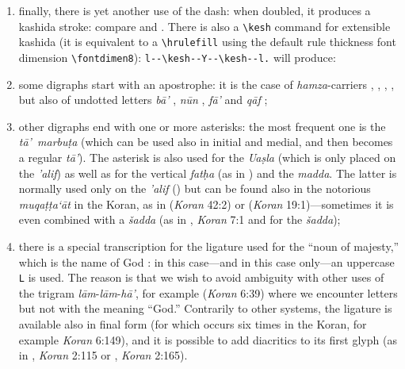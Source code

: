 \documentclass[11pt,a4paper]{article}
\def\hamza{'}%
\def\ayn{`}%
\begin{document}
\begin{enumerate}

\item finally, there is yet another use of the dash: when doubled, it produces a kashida
stroke: compare  and . There is also a \verb=\kesh= command for extensible kashida (it is equivalent to a \verb=\hrulefill= using the default rule thickness font dimension \verb=\fontdimen8=): \verb=l--\kesh--Y--\kesh--l.= will produce:

\noindent{}

\item some digraphs start with an apostrophe: it is the case of \emph{hamza}-carriers , , , ,  but also of undotted letters \emph{b\=a\hamza} , \emph{n\=un} , \emph{f\=a\hamza}  and \emph{q\=af} ;

\item other digraphs end with one or more asterisks: the most frequent one is the \emph{t\=a\hamza\ marbu\d{t}a}  (which can be used also in initial and medial, and then becomes a regular \emph{t\=a\hamza}). The asterisk is also used for the \emph{Ua\d{s}la} (which is only placed on the \emph{\hamza$\!$alif})  as well as for the vertical \emph{fat\d{h}a} (as in ) and the \emph{madda}. The latter is normally used only on the \emph{\hamza$\!$alif} () but can be found also in the notorious \emph{muqa\d t\d ta\ayn\=at} in the Koran, as in  (\emph{Koran} 42:2) or  (\emph{Koran} 19:1)---sometimes it is even combined with a \emph{\v{s}adda} (as in , \emph{Koran} 7:1 and \cite[p.~111]{syed} for the \emph{\v{s}adda});

\item there is a special transcription for the ligature  used for the  ``noun of majesty,'' which is the name of God : in this case---and in this case only---an uppercase \texttt{L} is used. The reason is that we wish to avoid ambiguity with other uses of the trigram \emph{l\=am}-\emph{l\=am}-\emph{h\=a\hamza}, for example  (\emph{Koran} 6:39) where we encounter letters  but not with the meaning ``God.'' Contrarily to other systems, the  ligature is available also in final form (for  which occurs six times in the Koran, for example  \emph{Koran} 6:149), and it is possible to add diacritics to its first glyph (as in , \emph{Koran} 2:115 or , \emph{Koran} 2:165).
\end{enumerate}
\end{document}
